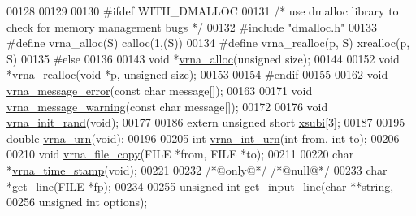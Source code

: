 \begin{DoxyCode}
00128 
00129 
00130 \textcolor{preprocessor}{#ifdef WITH\_DMALLOC}
00131 \textcolor{comment}{/* use dmalloc library to check for memory management bugs */}
00132 \textcolor{preprocessor}{#include "dmalloc.h"}
00133 \textcolor{preprocessor}{#define vrna\_alloc(S)       calloc(1,(S))}
00134 \textcolor{preprocessor}{#define vrna\_realloc(p, S)  xrealloc(p, S)}
00135 \textcolor{preprocessor}{#else}
00136 
00143 \textcolor{keywordtype}{void}  *\hyperlink{group__utils_gaf37a0979367c977edfb9da6614eebe99}{vrna\_alloc}(\textcolor{keywordtype}{unsigned} size);
00144 
00152 \textcolor{keywordtype}{void}  *\hyperlink{group__utils_ga27f4719a66c6f90d1cca3d1e6e696c6a}{vrna\_realloc}(\textcolor{keywordtype}{void} *p, \textcolor{keywordtype}{unsigned} size);
00153 
00154 \textcolor{preprocessor}{#endif}
00155 
00162 \textcolor{keywordtype}{void} \hyperlink{group__utils_gabb76f8f8dbd652fa4a24037cf4524373}{vrna\_message\_error}(\textcolor{keyword}{const} \textcolor{keywordtype}{char} message[]);
00163 
00171 \textcolor{keywordtype}{void} \hyperlink{group__utils_gafe4072406bd287c6857763dd7d2fe1f1}{vrna\_message\_warning}(\textcolor{keyword}{const} \textcolor{keywordtype}{char} message[]);
00172 
00176 \textcolor{keywordtype}{void} \hyperlink{group__utils_ga0ad1f40ea316e5c5918695c35613027a}{vrna\_init\_rand}(\textcolor{keywordtype}{void});
00177 
00186 \textcolor{keyword}{extern} \textcolor{keywordtype}{unsigned} \textcolor{keywordtype}{short} \hyperlink{group__utils_gaf9a866c8417afda7368bbac939ab3c47}{xsubi}[3];
00187 
00195 \textcolor{keywordtype}{double} \hyperlink{group__utils_ga384e256ebb295d04a14426179db0dd6e}{vrna\_urn}(\textcolor{keywordtype}{void});
00196 
00205 \textcolor{keywordtype}{int} \hyperlink{group__utils_ga46111bb3747dbcf4609f0d40ae169ad9}{vrna\_int\_urn}(\textcolor{keywordtype}{int} from, \textcolor{keywordtype}{int} to);
00206 
00210 \textcolor{keywordtype}{void} \hyperlink{group__utils_ga4382a56d2fee9ed738364b99329edc7c}{vrna\_file\_copy}(FILE *from, FILE *to);
00211 
00220 \textcolor{keywordtype}{char}  *\hyperlink{group__utils_gad3bbe8d01afb1310609cb018d5290550}{vrna\_time\_stamp}(\textcolor{keywordtype}{void});
00221 
00232 \textcolor{comment}{/*@only@*/} \textcolor{comment}{/*@null@*/}
00233 \textcolor{keywordtype}{char}  *\hyperlink{group__utils_gabe51806d14cff0789a8c1df7dbc45b71}{get\_line}(FILE *fp);
00234 
00255 \textcolor{keywordtype}{unsigned} \textcolor{keywordtype}{int} \hyperlink{group__utils_ga8ef1835eb83f542396f59f0b205965e5}{get\_input\_line}(\textcolor{keywordtype}{char} **\textcolor{keywordtype}{string},
00256                             \textcolor{keywordtype}{unsigned} \textcolor{keywordtype}{int} options);

\end{DoxyCode}
